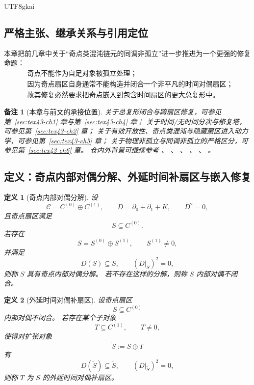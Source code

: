 \documentclass[12pt]{article}
\newtheorem{definition}{定义}[section]
\newtheorem{remark}{备注}[section]
\begin{document}
\begin{CJK*}{UTF8}{gkai}
\subsection{严格主张、继承关系与引用定位}
\label{subsec:tex43-ch7-convention}

本章把前几章中关于“奇点类混沌链元的同调非孤立”进一步推进为一个更强的修复命题：
\[
  \boxed{
    \begin{aligned}
      &\text{奇点不能作为自足对象被孤立处理；}\\
      &\text{因为奇点扇区自身通常不能构造并闭合一个非平凡的时间对偶扇区；}\\
      &\text{故其修复必然要求把奇点嵌入到包含时间扇区的更大总复形中。}
    \end{aligned}
  }
\]

\begin{remark}[本章与前文的承接位置]
关于总复形闭合与跨扇区修复，可参见第~\ref{sec:tex43-ch1} 章与第~\ref{sec:tex43-ch4} 章；
关于时间/无时间分次与修复塔，可参见第~\ref{sec:tex43-ch2} 章；
关于有效开放性、奇点类混沌与隐藏扇区进入动力学，可参见第~\ref{sec:tex43-ch5} 章；
关于物理非孤立与同调非孤立的严格区分，可参见第~\ref{sec:tex43-ch6} 章。
仓内外背景可继续参考
\cite{RepoTex29RepairableObstruction}、
\cite{RepoTex38JacobiBianchiRepair}、
\cite{RepoTex39StatRepair}、
\cite{GaoZheng2025GFramework}、
\cite{Weibel1994HomologicalAlgebra}、
\cite{Hatcher2002AT}。
\end{remark}

\subsection{定义：奇点内部对偶分解、外延时间补扇区与嵌入修复}
\label{subsec:tex43-ch7-definitions}

\begin{definition}[奇点内部对偶分解]
\label{def:tex43-singular-internal-dual}
设
\[
  \mathcal C=C^{(0)}\oplus C^{(1)},
  \qquad
  D=\partial_0+\partial_1+K,
  \qquad
  D^2=0,
\]
且奇点扇区满足
\[
  S\subseteq C^{(0)}.
\]
若存在
\[
  S=S^{(0)}\oplus S^{(1)},
  \qquad
  S^{(1)}\neq 0,
\]
并满足
\[
  D(S)\subseteq S,
  \qquad
  (D|_S)^2=0,
\]
则称 $S$ 具有\emph{奇点内部对偶分解}。
若不存在这样的分解，则称 $S$ \emph{内部对偶不闭合}。
\end{definition}

\begin{definition}[外延时间对偶补扇区]
\label{def:tex43-external-time-complement}
设奇点扇区
\[
  S\subseteq C^{(0)}
\]
内部对偶不闭合。
若存在某个子对象
\[
  T\subseteq C^{(1)},
  \qquad
  T\neq 0,
\]
使得对扩张对象
\[
  \widetilde{S}:=S\oplus T
\]
有
\[
  D(\widetilde{S})\subseteq \widetilde{S},
  \qquad
  (D|_{\widetilde{S}})^2=0,
\]
则称 $T$ 为 $S$ 的\emph{外延时间对偶补扇区}。
\end{definition}


\end{CJK*}
\end{document}
